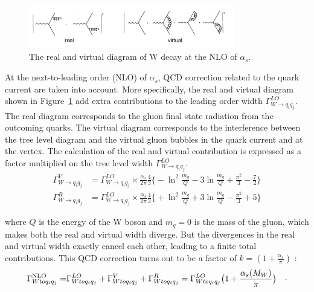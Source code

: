 \begin{figure}
    \centering
    \includegraphics[width=0.8\textwidth]{chapters/RelatedWorks/sectionVcs/figures/realVirtual.png}
    \caption{ The real and virtual diagram of W decay at the NLO of $\alpha_s$. }
    \label{fig:relatedWorks:vcs:realVirtual}
\end{figure}


\noindent At the next-to-leading order (NLO) of $\alpha_s$, QCD correction related to the quark current are taken into account. More specifically, the real and virtual diagram shown in Figure~\ref{fig:relatedWorks:vcs:realVirtual} add extra contributions to the leading order width $\Gamma_{W \to q_i q_j}^{LO} $. The real diagram corresponds to the gluon final state radiation from the outcoming quarks. The virtual diagram corresponds to the interference between the tree level diagram and the virtual gluon bubbles in the quark current and at the vertex. The calculation of the real and virtual contribution is expressed as a factor multiplied on the tree level width  $\Gamma_{W \to q_i q_j}^{LO} $.
 \begin{align}
 	\Gamma^V_{W \to q_i q_j}  &= \Gamma_{W \to q_i q_j}^{LO} \times \frac{\alpha_s}{2\pi}\frac{4}{3} \bigg \{  -\ln^2\frac{m_g}{Q} -3 \ln\frac{m_g}{Q} + \frac{\pi^2}{3}-\frac{7}{2} \bigg\} \\
    \Gamma^R_{W \to q_i q_j}  &= \Gamma_{W \to q_i q_j}^{LO} \times \frac{\alpha_s}{2\pi}\frac{4}{3} \bigg \{  +\ln^2\frac{m_g}{Q} + 3 \ln\frac{m_g}{Q} - \frac{\pi^2}{3}+ 5 \bigg\}
\end{align}
 
\noindent  where $Q$ is the energy of the W boson and $m_g=0$ is the mass of the gluon, which makes both the real and virtual width diverge. But the divergences in the real and virtual width exactly cancel each other, leading to a finite total contributions. This QCD correction turns out to be a factor of $k=(1+\frac{\alpha_s}{\pi})$ :
\begin{equation}
\begin{split}
    \Gamma_{W \to q_i q_j}^{\rm NLO} =& \Gamma_{W \to q_i q_j}^{LO} + \Gamma^{V}_{W \to q_i q_j}  + \Gamma^{R}_{W \to q_i q_j}
            =   \Gamma_{W \to q_i q_j}^{LO} \big( 1+ \frac{\alpha_s(M_W)}{\pi}\big)
\end{split} .
\end{equation}

